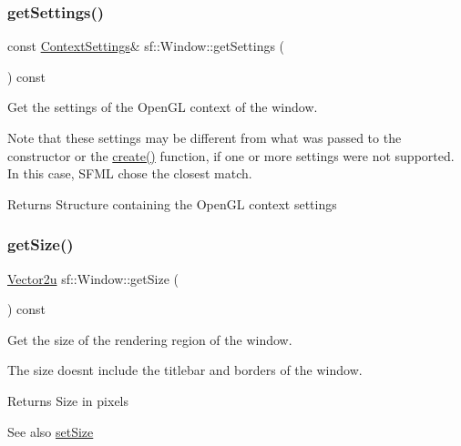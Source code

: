 \subsubsection{\texorpdfstring{get\+Settings()}{getSettings()}}
{\footnotesize\ttfamily const \hyperlink{structsf_1_1_context_settings}{Context\+Settings}\& sf\+::\+Window\+::get\+Settings (\begin{DoxyParamCaption}{ }\end{DoxyParamCaption}) const}



Get the settings of the Open\+GL context of the window. 

Note that these settings may be different from what was passed to the constructor or the \hyperlink{classsf_1_1_window_a30e6edf2162f8dbff61023b9de5d961d}{create()} function, if one or more settings were not supported. In this case, S\+F\+ML chose the closest match.

\begin{DoxyReturn}{Returns}
Structure containing the Open\+GL context settings 
\end{DoxyReturn}
\mbox{\label{classsf_1_1_window_a3969926741cbe83d7f9eeaf5333d4e71}} 
\subsubsection{\texorpdfstring{get\+Size()}{getSize()}}
{\footnotesize\ttfamily \hyperlink{classsf_1_1_vector2}{Vector2u} sf\+::\+Window\+::get\+Size (\begin{DoxyParamCaption}{ }\end{DoxyParamCaption}) const}



Get the size of the rendering region of the window. 

The size doesn\textquotesingle{}t include the titlebar and borders of the window.

\begin{DoxyReturn}{Returns}
Size in pixels
\end{DoxyReturn}
\begin{DoxySeeAlso}{See also}
\hyperlink{classsf_1_1_window_ab94ea32f22d15c0df11588e319de2546}{set\+Size} 
\end{DoxySeeAlso}
\mbox{\label{classsf_1_1_window_ad2fa6be5104ec0bfe79af7a5f524ea90}} 

